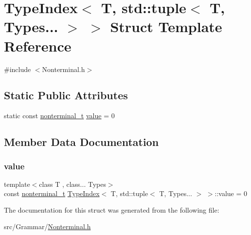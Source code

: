 \hypertarget{struct_type_index_3_01_t_00_01std_1_1tuple_3_01_t_00_01_types_8_8_8_01_4_01_4}{}\section{Type\+Index$<$ T, std\+:\+:tuple$<$ T, Types... $>$ $>$ Struct Template Reference}
\label{struct_type_index_3_01_t_00_01std_1_1tuple_3_01_t_00_01_types_8_8_8_01_4_01_4}


{\ttfamily \#include $<$Nonterminal.\+h$>$}

\subsection*{Static Public Attributes}
\begin{DoxyCompactItemize}
\item 
static const \hyperlink{_nonterminal_8h_a1c5bfe9b903f69c83bbde5da7035fef3}{nonterminal\+\_\+t} \hyperlink{struct_type_index_3_01_t_00_01std_1_1tuple_3_01_t_00_01_types_8_8_8_01_4_01_4_a163ba00344b287c191f05761d34556d2}{value} = 0
\end{DoxyCompactItemize}


\subsection{Member Data Documentation}
\mbox{\label{struct_type_index_3_01_t_00_01std_1_1tuple_3_01_t_00_01_types_8_8_8_01_4_01_4_a163ba00344b287c191f05761d34556d2}} 
\subsubsection{\texorpdfstring{value}{value}}
{\footnotesize\ttfamily template$<$class T , class... Types$>$ \\
const \hyperlink{_nonterminal_8h_a1c5bfe9b903f69c83bbde5da7035fef3}{nonterminal\+\_\+t} \hyperlink{struct_type_index}{Type\+Index}$<$ T, std\+::tuple$<$ T, Types... $>$ $>$\+::value = 0\hspace{0.3cm}{\ttfamily [static]}}



The documentation for this struct was generated from the following file\+:\begin{DoxyCompactItemize}
\item 
src/\+Grammar/\hyperlink{_nonterminal_8h}{Nonterminal.\+h}\end{DoxyCompactItemize}
